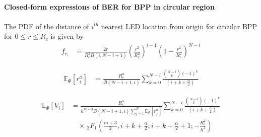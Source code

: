 \documentclass[slidestop,usepdftitle=false]{gvvslides}
\providecommand{\sbrak}[1]{\ensuremath{{}\left[#1\right]}}
\providecommand{\brak}[1]{\ensuremath{\left(#1\right)}}
\begin{document}
\begin{frame}
\frametitle{\,}
\framesubtitle{Closed-form expressions of BER for BPP in circular region}
\begin{list}{}{}
\vfill
\item<1->
The PDF of the distance of $i^{th}$ nearest LED location from origin for circular BPP for $0 \leq r \leq R_c$ is given by %
\begin{align}
f_{r_i}	&=
\frac{2r}{R_c^2 B\brak{i,N-i+1}}\brak{\frac{r^2}{R_c^2}}^{i-1}\brak{1-\frac{r^2}{R_c^2}}^{N-i}
\nonumber 
   \end{align}
   \vfill
   \item<2->
   \begin{align}
   \mathbb{E}_{\Phi}\sbrak{r_i^{\alpha}} & =\frac{R_c^{\alpha}}{\mathcal{B}\brak{N-i+1,i}}\sum_{k=0}^{N-i}\frac{\binom{N-i}{k}\brak{-1}^{k}}{\brak{i+k+\frac{\alpha}{2}}}  \nonumber
      \end{align}
      
      \vfill
\item<3>
      \begin{align}
   \mathbb{E}_{\Phi}\sbrak{V_i}
     &=\frac{R_c^{\alpha}}{h^{m+3}\mathcal{B}\brak{N-i+1,i}\sum_{j=1}^N\mathbb{E}_{\Phi}\sbrak{r_j^{\alpha}}} \sum_{k=0}^{N-i}\frac{\binom{N-i}{k}(-1)^{k}}{\brak{i+k+\frac{\alpha}{2}}} \nonumber\\
    & \quad \times  \, _2F_1\brak{\frac{m+3}{2},i+k+\frac{\alpha}{2};i+k+\frac{\alpha}{2}+1;-\frac{R_c^2}{h^2}} \nonumber
   \end{align}
   \vfill
   \end{list}
\end{frame}
\end{document}
